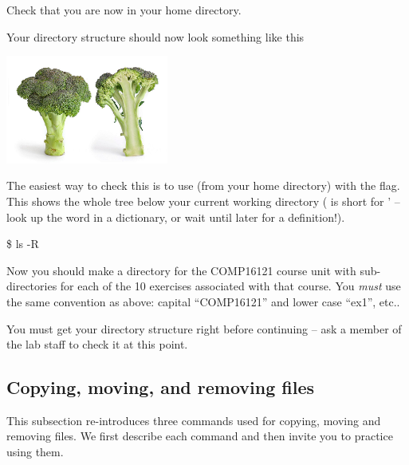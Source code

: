 Check that you are now in your home directory.

Your directory structure should now look something like this
     \begin{center}
       \includegraphics[width=0.4\textwidth]{images/broccoli} %
     \end{center}

     
The easiest way to check this is to use (from your home directory)
 with the  flag. This shows the whole tree
below your current working directory ( is short for
'  -- look up the word in a dictionary, or wait until later for a
 definition!).

\begin{ttoutenv}
\$ ls -R 
\end{ttoutenv}
%

  Now you should make a directory for the COMP16121 course unit
  with
  sub-directories for each of the 10 exercises associated with that
  course. You \emph{must} use the same convention as above:
  capital ``COMP16121'' and lower case ``ex1'', etc..

You must get your directory structure right before continuing -- ask a
member of the lab staff to check it at this point.


\subsection{Copying, moving, and removing files}

This subsection re-introduces three commands used for copying, moving and
removing files. We first describe each command and then invite you to
practice using them.

